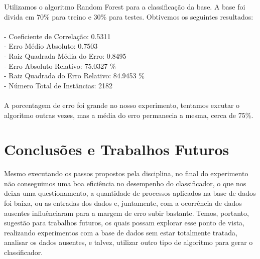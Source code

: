 \documentclass[12pt]{article}
\begin{document}
Utilizamos o algoritmo Random Forest para a classificação da base. A base foi divida em 70\% para treino e 30\% para testes. Obtivemos os seguintes resultados:\\\\
- Coeficiente de Correlação: 0.5311\\
- Erro Médio Absoluto: 0.7503\\
- Raiz Quadrada Média do Erro: 0.8495\\
- Erro Absoluto Relativo: 75.0327 \%\\
- Raiz Quadrada do Erro Relativo: 84.9453 \%\\
- Número Total de Instâncias: 2182\\\\
A porcentagem de erro foi grande no nosso experimento, tentamos excutar o algoritmo outras vezes, mas a média do erro permanecia a mesma, cerca de 75\%.

\section{Conclusões e Trabalhos Futuros}

Mesmo executando os passos propostos pela disciplina, no final do experimento não conseguimos uma boa eficiência no desempenho do classificador, o que nos deixa uma questionamento, a quantidade de processos aplicados na base de dados foi baixa, ou as entradas dos dados e, juntamente, com a ocorrência de dados ausentes influênciaram para a margem de erro subir bastante. Temos, portanto, sugestão para trabalhos futuros, os quais possam explorar esse ponto de vista, realizando experimentos com a base de dados sem estar totalmente tratada, analisar os dados ausentes, e talvez, utilizar outro tipo de algoritmo para gerar o classificador.



\end{document}
